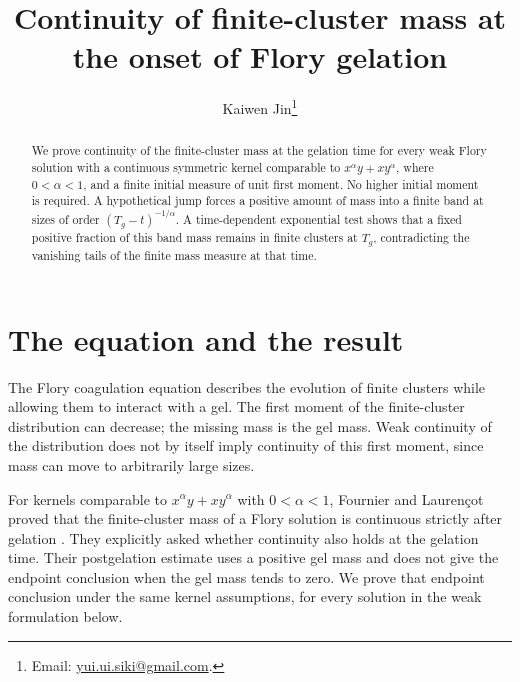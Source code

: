 \documentclass[11pt]{article}
\title{Continuity of finite-cluster mass at the onset of Flory gelation}
\author{Kaiwen Jin\thanks{Email: \href{mailto:yui.ui.siki@gmail.com}{yui.ui.siki@gmail.com}.}}
\date{}
\begin{document}
\maketitle
\begin{abstract}
We prove continuity of the finite-cluster mass at the gelation time for every weak Flory solution with a continuous symmetric kernel comparable to $x^\alpha y+xy^\alpha$, where $0<\alpha<1$, and a finite initial measure of unit first moment. No higher initial moment is required. A hypothetical jump forces a positive amount of mass into a finite band at sizes of order $(T_g-t)^{-1/\alpha}$. A time-dependent exponential test shows that a fixed positive fraction of this band mass remains in finite clusters at $T_g$, contradicting the vanishing tails of the finite mass measure at that time.
\end{abstract}

\section{The equation and the result}\label{sec:intro}

The Flory coagulation equation describes the evolution of finite clusters while allowing them to interact with a gel. The first moment of the finite-cluster distribution can decrease; the missing mass is the gel mass. Weak continuity of the distribution does not by itself imply continuity of this first moment, since mass can move to arbitrarily large sizes.

For kernels comparable to $x^\alpha y+xy^\alpha$ with $0<\alpha<1$, Fournier and Lauren\c{c}ot proved that the finite-cluster mass of a Flory solution is continuous strictly after gelation \cite[Proposition~2.3]{FL}. They explicitly asked whether continuity also holds at the gelation time. Their postgelation estimate uses a positive gel mass and does not give the endpoint conclusion when the gel mass tends to zero. We prove that endpoint conclusion under the same kernel assumptions, for every solution in the weak formulation below.
\end{document}
